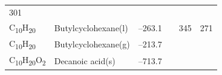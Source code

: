 \documentclass[
]{book}
\theoremstyle{definition}
\theoremstyle{definition}
\theoremstyle{definition}
\theoremstyle{remark}
\begin{document}
\begin{longtable}[]{@{}llllll@{}}
\begin{minipage}[t]{0.14\columnwidth}
301\strut
\end{minipage}\tabularnewline
\begin{minipage}[t]{0.07\columnwidth}\raggedright
C\textsubscript{10}H\textsubscript{20}\strut
\end{minipage} & \begin{minipage}[t]{0.17\columnwidth}\raggedright
Butylcyclohexane(l)\strut
\end{minipage} & \begin{minipage}[t]{0.15\columnwidth}\raggedright
--263.1\strut
\end{minipage} & \begin{minipage}[t]{0.15\columnwidth}\raggedright
\strut
\end{minipage} & \begin{minipage}[t]{0.14\columnwidth}\raggedright
345\strut
\end{minipage} & \begin{minipage}[t]{0.14\columnwidth}\raggedright
271\strut
\end{minipage}\tabularnewline
\begin{minipage}[t]{0.07\columnwidth}\raggedright
C\textsubscript{10}H\textsubscript{20}\strut
\end{minipage} & \begin{minipage}[t]{0.17\columnwidth}\raggedright
Butylcyclohexane(g)\strut
\end{minipage} & \begin{minipage}[t]{0.15\columnwidth}\raggedright
--213.7\strut
\end{minipage} & \begin{minipage}[t]{0.15\columnwidth}\raggedright
\strut
\end{minipage} & \begin{minipage}[t]{0.14\columnwidth}\raggedright
\strut
\end{minipage} & \begin{minipage}[t]{0.14\columnwidth}\raggedright
\strut
\end{minipage}\tabularnewline
\begin{minipage}[t]{0.07\columnwidth}\raggedright
C\textsubscript{10}H\textsubscript{20}O\textsubscript{2}\strut
\end{minipage} & \begin{minipage}[t]{0.17\columnwidth}\raggedright
Decanoic acid(s)\strut
\end{minipage} & \begin{minipage}[t]{0.15\columnwidth}\raggedright
--713.7\strut
\end{minipage} & \begin{minipage}[t]{0.15\columnwidth}\raggedright

\end{minipage}
\end{longtable}
\end{document}
